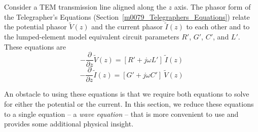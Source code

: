 

\label{m0027_Wave_Equations_for_a_Transmission_Line} %

Consider a TEM transmission line 
aligned along the $z$ axis.
The phasor form of the Telegrapher's Equations 
(Section~\ref{m0079_Telegraphers_Equations}) relate the potential phasor
$\widetilde{V}(z)$ and the current phasor $\widetilde{I}(z)$ to each other and 
to the lumped-element model equivalent circuit parameters $R'$, $G'$, $C'$, and $L'$.
These equations are
%
\begin{equation}
-\frac{\partial}{\partial z} \widetilde{V}(z) = \left[ R' + j\omega L' \right]~\widetilde{I}(z)
\label{m0027_eTelegraphersEquation1p}
\end{equation}
%
\begin{equation}
-\frac{\partial}{\partial z} \widetilde{I}(z) = \left[ G' + j\omega C' \right]~\widetilde{V}(z)
\label{m0027_eTelegraphersEquation2p}
\end{equation}

An obstacle to using these equations is that we require both equations to solve for either the potential or the current.
In this section, we reduce these equations to a single equation -- a \emph{wave equation} -- that is more convenient to use and provides some additional physical insight.

